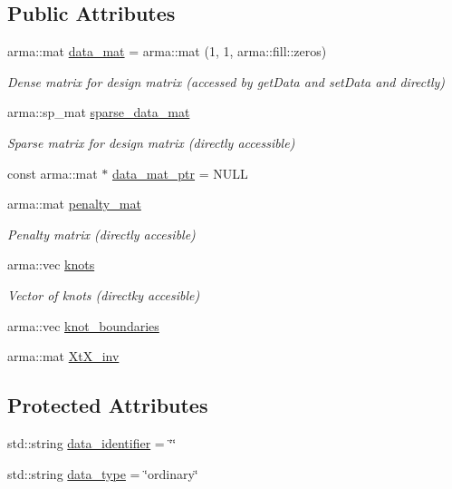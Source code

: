 \subsection*{Public Attributes}
\begin{DoxyCompactItemize}
\item 
arma\+::mat \mbox{\hyperlink{classdata_1_1_data_ae78ec61bd569e32f3b34056d3f6f48f4}{data\+\_\+mat}} = arma\+::mat (1, 1, arma\+::fill\+::zeros)
\begin{DoxyCompactList}\small\item\em Dense matrix for design matrix (accessed by get\+Data and set\+Data and directly) \end{DoxyCompactList}\item 
arma\+::sp\+\_\+mat \mbox{\hyperlink{classdata_1_1_data_abc5c5380b4aa8120cdda74195b90955f}{sparse\+\_\+data\+\_\+mat}}
\begin{DoxyCompactList}\small\item\em Sparse matrix for design matrix (directly accessible) \end{DoxyCompactList}\item 
const arma\+::mat $\ast$ \mbox{\hyperlink{classdata_1_1_data_a3aa3b54f91bede8726e22ccfe8751b31}{data\+\_\+mat\+\_\+ptr}} = N\+U\+LL
\item 
arma\+::mat \mbox{\hyperlink{classdata_1_1_data_a1fd248ad8885deae217b8720fcf22e78}{penalty\+\_\+mat}}
\begin{DoxyCompactList}\small\item\em Penalty matrix (directly accesible) \end{DoxyCompactList}\item 
arma\+::vec \mbox{\hyperlink{classdata_1_1_data_abe246684192000f9a0d85bc84bfcccdf}{knots}}
\begin{DoxyCompactList}\small\item\em Vector of knots (directky accesible) \end{DoxyCompactList}\item 
arma\+::vec \mbox{\hyperlink{classdata_1_1_data_acfe89753c5bbb4a9361b5aa0f6d7f015}{knot\+\_\+boundaries}}
\item 
arma\+::mat \mbox{\hyperlink{classdata_1_1_data_a31bdf7564f8589487a0ee9952ebef0c0}{Xt\+X\+\_\+inv}}
\end{DoxyCompactItemize}
\subsection*{Protected Attributes}
\begin{DoxyCompactItemize}
\item 
std\+::string \mbox{\hyperlink{classdata_1_1_data_ad61ef163c5ec01dd46be054a688d2be8}{data\+\_\+identifier}} = \char`\"{}\char`\"{}
\item 
std\+::string \mbox{\hyperlink{classdata_1_1_data_a2331c9e9c2b0905c6a2eedc68889a698}{data\+\_\+type}} = \char`\"{}ordinary\char`\"{}
\end{DoxyCompactItemize}


